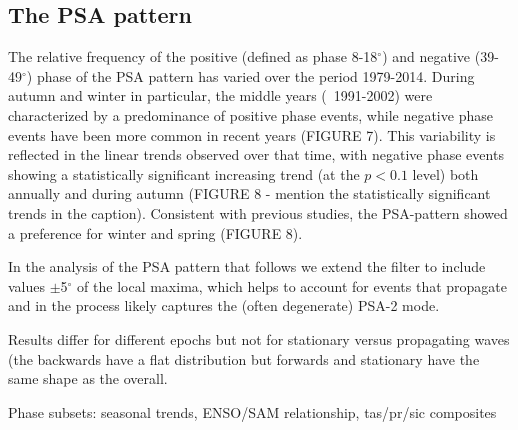 \subsection{The PSA pattern}

The relative frequency of the positive (defined as phase 8-18$^{\circ}$) and negative (39-49$^{\circ}$) phase of the PSA pattern has varied over the period 1979-2014. During autumn and winter in particular, the middle years (~1991-2002) were characterized by a predominance of positive phase events, while negative phase events have been more common in recent years (FIGURE 7). This variability is reflected in the linear trends observed over that time, with negative phase events showing a statistically significant increasing trend (at the $p < 0.1$ level) both annually and during autumn (FIGURE 8 - mention the statistically significant trends in the caption). Consistent with previous studies, the PSA-pattern showed a preference for winter and spring (FIGURE 8).





In the analysis of the PSA pattern that follows we extend the filter to include values $\pm$5$^{\circ}$ of the local maxima, which helps to account for events that propagate and in the process likely captures the (often degenerate) PSA-2 mode. 

Results differ for different epochs but not for stationary versus propagating waves (the backwards have a flat distribution but forwards and stationary have the same shape as the overall.

Phase subsets: seasonal trends, ENSO/SAM relationship, tas/pr/sic composites